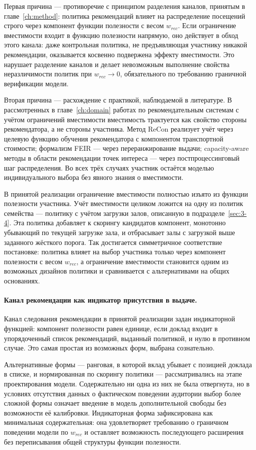 Первая причина --- противоречие с принципом разделения каналов, принятым в главе~\ref{ch:method}: политика рекомендаций влияет на распределение посещений строго через компонент функции полезности с весом $w_{rec}$. Если ограничение вместимости входит в функцию полезности напрямую, оно действует в обход этого канала: даже контрольная политика, не предъявляющая участнику никакой рекомендации, оказывается косвенно подвержена эффекту вместимости. Это нарушает разделение каналов и делает невозможным выполнение свойства неразличимости политик при $w_{rec} \to 0$, обязательного по требованию граничной верификации модели.

Вторая причина --- расхождение с практикой, наблюдаемой в литературе. В рассмотренных в главе~\ref{ch:domain} работах по рекомендательным системам с учётом ограничений вместимости вместимость трактуется как свойство стороны рекомендатора, а не стороны участника. Метод ReCon реализует учёт через целевую функцию обучения рекомендатора с компонентом транспортной стоимости; формализм FEIR --- через переранжирование выдачи; capacity-aware методы в области рекомендации точек интереса --- через постпроцессинговый шаг распределения. Во всех трёх случаях участник остаётся моделью индивидуального выбора без явного знания о вместимости.

В принятой реализации ограничение вместимости полностью изъято из функции полезности участника. Учёт вместимости целиком ложится на одну из политик семейства --- политику с учётом загрузки залов, описанную в подразделе~\ref{sec:3-4}. Эта политика добавляет к скорингу кандидатов компонент, монотонно убывающий по текущей загрузке зала, и отбрасывает залы с загрузкой выше заданного жёсткого порога. Так достигается симметричное соответствие постановке: политика влияет на выбор участника только через компонент полезности с весом $w_{rec}$, а ограничение вместимости становится одним из возможных дизайнов политики и сравнивается с альтернативами на общих основаниях.

\paragraph{Канал рекомендации как индикатор присутствия в выдаче.}
Канал следования рекомендации в принятой реализации задан индикаторной функцией: компонент полезности равен единице, если доклад входит в упорядоченный список рекомендаций, выданный политикой, и нулю в противном случае. Это самая простая из возможных форм, выбрана сознательно.

Альтернативные формы --- ранговая, в которой вклад убывает с позицией доклада в списке, и нормированная по скорингу политики --- рассматривались на этапе проектирования модели. Содержательно ни одна из них не была отвергнута, но в условиях отсутствия данных о фактическом поведении аудитории выбор более сложной формы означает введение в модель дополнительной свободы без возможности её калибровки. Индикаторная форма зафиксирована как минимальная содержательная: она удовлетворяет требованию о граничном поведении модели по $w_{rec}$ и оставляет возможность последующего расширения без переписывания общей структуры функции полезности.

